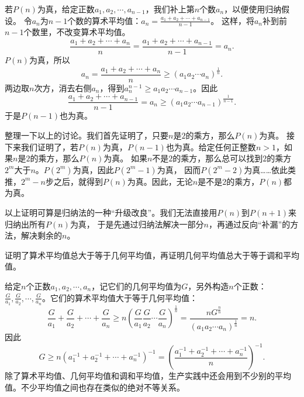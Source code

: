 \documentclass[12pt,UTF8]{ctexbook}
\begin{document}
若$P(n)$为真，给定正数$a_1, a_2, \cdots , a_{n-1}$，我们补上第$n$个数$a_n$，以便使用归纳假设。
令$a_n$为$n-1$个数的算术平均值：$a_n = \frac{a_1 + a_2 + \cdots + a_{n-1}}{n-1}$。
这样，将$a_n$补到前$n-1$个数里，不改变算术平均值。
$$ \frac{a_1 + a_2 + \cdots + a_n}{n} = \frac{a_1 + a_2 + \cdots + a_{n-1}}{n-1} = a_n. $$
$P(n)$为真，所以
$$ a_n = \frac{a_1 + a_2 + \cdots + a_n}{n} \geqslant (a_1a_2\cdots a_{n})^{\frac{1}{n}}. $$
两边取$n$次方，消去右侧$a_n$，得到$a_n^{n-1} \geqslant a_1a_2\cdots a_{n-1}$。因此
$$   \frac{a_1 + a_2 + \cdots + a_{n-1}}{n-1} = a_n \geqslant (a_1a_2\cdots a_{n-1})^{\frac{1}{n-1}}. $$
于是$P(n-1)$也为真。

整理一下以上的讨论。我们首先证明了，只要$n$是$2$的乘方，那么$P(n)$为真。
接下来我们证明了，若$P(n)$为真，$P(n-1)$也为真。给定任何正整数$n>1$，如果$n$是$2$的乘方，那么$P(n)$为真。
如果$n$不是$2$的乘方，那么总可以找到$2$的乘方$2^m$大于$n$。$P(2^m)$为真，因此$P(2^m-1)$为真，
因而$P(2^m-2)$为真……依此类推，$2^m-n$步之后，就得到$P(n)$为真。因此，无论$n$是不是$2$的乘方，$P(n)$都为真。

以上证明可算是归纳法的一种“升级改良”。我们无法直接用$P(n)$到$P(n+1)$来归纳出所有$P(n)$为真，
于是先通过归纳法解决一部分$n$，再通过反向“补漏”的方法，解决剩余的$n$。

证明了算术平均值总大于等于几何平均值，再证明几何平均值总大于等于调和平均值。

给定$n$个正数$a_1, a_2, \cdots , a_n$，记它们的几何平均值为$G$，另外构造$n$个正数：
$\frac{G}{a_1}, \frac{G}{a_2}, \cdots , \frac{G}{a_n}$。它们的算术平均值大于等于几何平均值：
$$ \frac{G}{a_1} + \frac{G}{a_2} + \cdots + \frac{G}{a_n} \geqslant n\left(\frac{G}{a_1}\frac{G}{a_2}\cdots \frac{G}{a_n}\right)^{\frac{1}{n}} = \frac{nG^\frac{n}{n}}{(a_1a_2\cdots a_{n})^{\frac{1}{n}}} = n.$$
因此
$$ G \geqslant n \left(a_1^{-1} + a_2^{-1} + \cdots + a_n^{-1}\right)^{-1} =  \left(\frac{a_1^{-1} + a_2^{-1} + \cdots + a_n^{-1}}{n}\right)^{-1}. $$
除了算术平均值、几何平均值和调和平均值，生产实践中还会用到不少别的平均值。不少平均值之间也存在类似的绝对不等关系。

\end{document}
